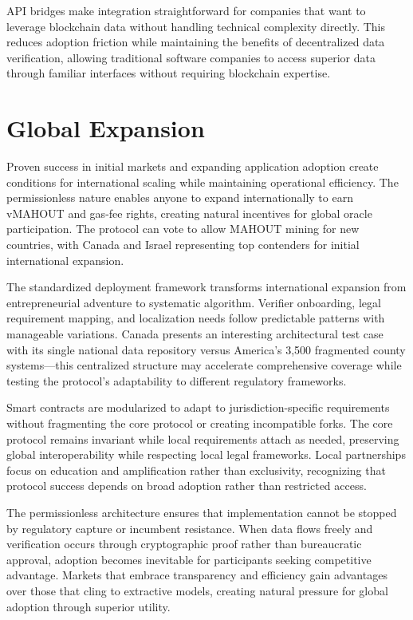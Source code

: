 API bridges make integration straightforward for companies that want to leverage blockchain data without handling technical complexity directly. This reduces adoption friction while maintaining the benefits of decentralized data verification, allowing traditional software companies to access superior data through familiar interfaces without requiring blockchain expertise.

\section{Global Expansion}

Proven success in initial markets and expanding application adoption create conditions for international scaling while maintaining operational efficiency. The permissionless nature enables anyone to expand internationally to earn vMAHOUT and gas-fee rights, creating natural incentives for global oracle participation. The protocol can vote to allow MAHOUT mining for new countries, with Canada and Israel representing top contenders for initial international expansion.

The standardized deployment framework transforms international expansion from entrepreneurial adventure to systematic algorithm. Verifier onboarding, legal requirement mapping, and localization needs follow predictable patterns with manageable variations. Canada presents an interesting architectural test case with its single national data repository versus America's 3,500 fragmented county systems---this centralized structure may accelerate comprehensive coverage while testing the protocol's adaptability to different regulatory frameworks.

Smart contracts are modularized to adapt to jurisdiction-specific requirements without fragmenting the core protocol or creating incompatible forks. The core protocol remains invariant while local requirements attach as needed, preserving global interoperability while respecting local legal frameworks. Local partnerships focus on education and amplification rather than exclusivity, recognizing that protocol success depends on broad adoption rather than restricted access.

The permissionless architecture ensures that implementation cannot be stopped by regulatory capture or incumbent resistance. When data flows freely and verification occurs through cryptographic proof rather than bureaucratic approval, adoption becomes inevitable for participants seeking competitive advantage. Markets that embrace transparency and efficiency gain advantages over those that cling to extractive models, creating natural pressure for global adoption through superior utility.

